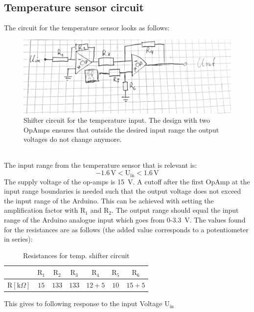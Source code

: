 \documentclass[12pt]{scrartcl}
\begin{document}
    \subsection{Temperature sensor circuit}
      The circuit for the temperature sensor looks as follows:
      \begin{figure}[h]
        \includegraphics[width = \textwidth]{circ.png}
        \caption{Shifter circuit for the temperature input. The design with
        two OpAmps ensures that outside the desired input range the output
        voltages do not change anymore.}
        \label{fig1}
      \end{figure}
      \\The input range from the temperature sensor that is relevant is:
      $$-1.6 \, \text{V} < \text{U}_{\text{in}} < 1.6\, \text{V}$$
      The supply voltage of the op-amps is 15~V. A cutoff after
      the first OpAmp at the input range boundaries is needed such that the
      output voltage does not exceed the input range of the Arduino. This can be
      achieved with
      setting the amplification factor with $\text{R}_1$ and $\text{R}_2$. The output range
      should equal the input range of the Arduino analogue input which goes from
      0-3.3~V. The values found for the resistances are as follows (the added value
      corresponds to a potentiometer in series): \\
      \begin{table}[H]\label{tempres}
        \begin{tabular}{l|c c c c c c}
          & $\text{R}_1$ & $\text{R}_2$ & $\text{R}_3$ & $\text{R}_4$
          & $\text{R}_5$ & $\text{R}_6$ \\
          \hline\vspace{5pt}
          $\text{R}[\text{k}\Omega]$ & $15$ & $133$ & $133$ & $12 + 5$ & $10$
          & $15 + 5$
        \end{tabular}
        \caption{Resistances for temp. shifter circuit}
      \end{table}
      This gives to following response to the input Voltage $\text{U}_{\text{in}}$\\
\end{document}
